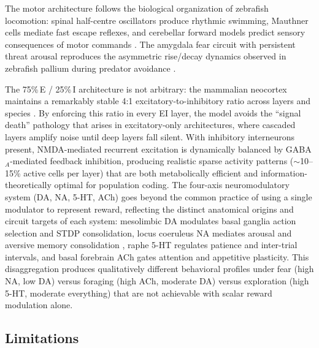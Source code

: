 \documentclass[12pt]{article}
\begin{document}
The motor architecture follows the biological organization of zebrafish
locomotion: spinal half-centre oscillators produce rhythmic swimming,
Mauthner cells mediate fast escape reflexes, and cerebellar forward
models predict sensory consequences of motor commands
\citep{marques2018,temizer2015}.
The amygdala fear circuit with persistent threat arousal reproduces
the asymmetric rise/decay dynamics observed in zebrafish pallium during
predator avoidance \citep{ahrens2013}.

The 75\%\,E / 25\%\,I architecture is not arbitrary: the mammalian
neocortex maintains a remarkably stable 4:1 excitatory-to-inhibitory
ratio across layers and species \citep{carandini2012}.
By enforcing this ratio in every EI layer, the model avoids the ``signal
death'' pathology that arises in excitatory-only architectures,
where cascaded layers amplify noise until deep layers fall silent.
With inhibitory interneurons present, NMDA-mediated recurrent excitation
is dynamically balanced by GABA$_A$-mediated feedback inhibition,
producing realistic sparse activity patterns ($\sim$10--15\% active
cells per layer) that are both metabolically efficient and
information-theoretically optimal for population coding.
The four-axis neuromodulatory system (DA, NA, 5-HT, ACh) goes beyond
the common practice of using a single modulator to represent reward,
reflecting the distinct anatomical origins and circuit targets of
each system: mesolimbic DA modulates basal ganglia action selection
and STDP consolidation, locus coeruleus NA mediates arousal and
aversive memory consolidation \citep{sara2009}, raphe 5-HT regulates
patience and inter-trial intervals, and basal forebrain ACh gates
attention and appetitive plasticity.
This disaggregation produces qualitatively different behavioral
profiles under fear (high NA, low DA) versus foraging (high ACh, moderate
DA) versus exploration (high 5-HT, moderate everything) that
are not achievable with scalar reward modulation alone.

\subsection{Limitations}
\end{document}
